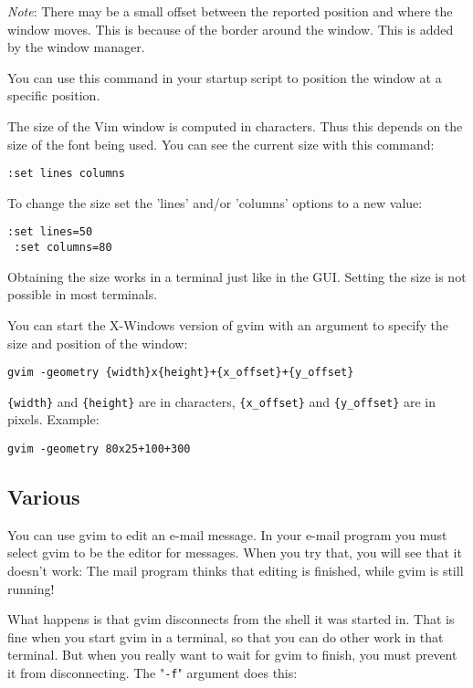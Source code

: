 \emph{Note}: There may be a small offset between the reported position and where the window moves.
This is because of the border around the window.
This is added by the window manager.

You can use this command in your startup script to position the window at a specific position.

The size of the Vim window is computed in characters.
Thus this depends on the size of the font being used.
You can see the current size with this command:

\begin{Verbatim}[samepage=true]
 :set lines columns
\end{Verbatim}

To change the size set the 'lines' and/or 'columns' options to a new value:

\begin{Verbatim}[samepage=true]
 :set lines=50
 :set columns=80
\end{Verbatim}

Obtaining the size works in a terminal just like in the GUI.
Setting the size is not possible in most terminals.

You can start the X-Windows version of gvim with an argument to specify the size and position of the window:

\begin{Verbatim}[samepage=true]
 gvim -geometry {width}x{height}+{x_offset}+{y_offset}
\end{Verbatim}

\verb!{width}! and \verb!{height}! are in characters, \verb!{x_offset}! and \verb!{y_offset}! are in pixels.
Example:

\begin{Verbatim}[samepage=true]
 gvim -geometry 80x25+100+300
\end{Verbatim}
\subsection{Various}
You can use gvim to edit an e-mail message.
In your e-mail program you must select gvim to be the editor for messages.
When you try that, you will see that it doesn't work: The mail program thinks that editing is finished, while gvim is still running!

What happens is that gvim disconnects from the shell it was started in.
That is fine when you start gvim in a terminal, so that you can do other work in that terminal.
But when you really want to wait for gvim to finish, you must prevent it from disconnecting.
The "\verb!-f!" argument does this:

